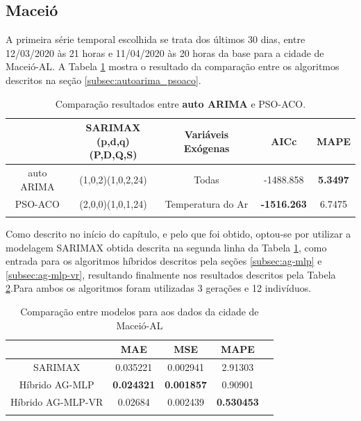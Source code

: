 \subsection{Maceió}

A primeira série temporal escolhida se trata dos últimos 30 dias, entre 12/03/2020 às 21 horas e 11/04/2020 às 20 horas da base para a cidade de Maceió-AL. A Tabela \ref{tab:cap4_comp_maceio_autoarima_psoaco} mostra o resultado da comparação entre os algoritmos descritos na seção \ref{subsec:autoarima_psoaco}. 

\begin{table}[htbp]
\caption{Comparação resultados entre \textbf{auto ARIMA} e PSO-ACO.}
\begin{center}
\begin{tabular}{ccccc}
                    & \Longstack{SARIMAX \\ (p,d,q)(P,D,Q,S)} & Variáveis Exógenas & AICc & MAPE  \\\hline
auto ARIMA & (1,0,2)(1,0,2,24) & Todas & -1488.858 & \textbf{5.3497} \\\hline
PSO-ACO             & (2,0,0)(1,0,1,24) & Temperatura do Ar & \textbf{-1516.263} & 6.7475 \\\hline
\label{tab:cap4_comp_maceio_autoarima_psoaco}
\end{tabular}
\end{center}
\end{table}

Como descrito no início do capítulo, e pelo que foi obtido, optou-se por utilizar a modelagem SARIMAX obtida descrita na segunda linha da Tabela \ref{tab:cap4_comp_maceio_autoarima_psoaco}, como entrada para os algoritmos híbridos descritos pela seções \ref{subsec:ag-mlp} e \ref{subsec:ag-mlp-vr}, resultando finalmente nos resultados descritos pela Tabela \ref{tab:cap4_comp_maceio_agmlp_agmlpvr}.Para ambos os algoritmos foram utilizadas 3 gerações e 12 indivíduos.

\begin{table}[htbp]
\caption{Comparação entre modelos para aos dados da cidade de Maceió-AL}
\begin{center}
\begin{tabular}{ccccc}
                & MAE & MSE & MAPE \\\hline
SARIMAX         & 0.035221 & 0.002941 & 2.91303 \\\hline
Híbrido AG-MLP  & \textbf{0.024321} & \textbf{0.001857} & 0.90901 \\\hline
Híbrido AG-MLP-VR & 0.02684 & 0.002439 & \textbf{0.530453} \\\hline
\label{tab:cap4_comp_maceio_agmlp_agmlpvr}
\end{tabular}
\end{center}
\end{table}

